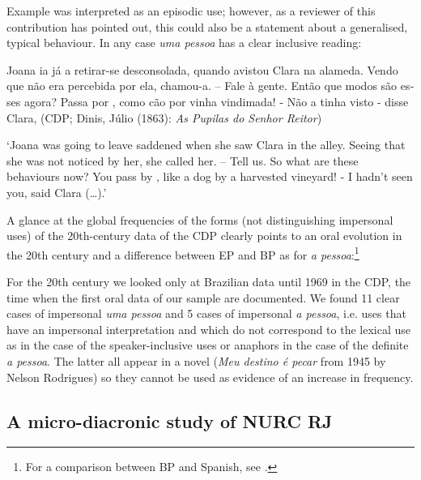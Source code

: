 \documentclass[output=paper]{langscibook}
\begin{document}
Example  was interpreted as an episodic use; however, as a reviewer of this contribution has pointed out, this could also be a statement about a generalised, typical behaviour. In any case \textit{uma pessoa} has a clear inclusive reading:



\eanoraggedright\label{ex:amaral:30}
\begin{otherlanguage}{portuguese}
Joana ia já a retirar-se desconsolada, quando avistou Clara na alameda. Vendo que não era percebida por ela, chamou-a. – Fale à gente. Então que modos são esses agora? Passa por , como cão por vinha vindimada! - Não a tinha visto - disse Clara, {(CDP; Dinis, Júlio (1863):} \textit{As Pupilas do Senhor Reitor})
\end{otherlanguage}
\glt ‘Joana was going to leave saddened when she saw Clara in the alley. Seeing that she was not noticed by her, she called her. – Tell us. So what are these behaviours now? You pass by , like a dog by a harvested vineyard! - I hadn’t seen you, said Clara (…).' 
\z 


A glance at the global frequencies of the forms (not distinguishing impersonal uses) of the 20th-century data of the CDP clearly points to an oral evolution in the 20th century and a difference between EP and BP as for \textit{a pessoa}:\footnote{For a comparison between BP and Spanish, see \citet{Amaral2017}.}


For the 20th century we looked only at Brazilian data until 1969 in the CDP, the time when the first oral data of our sample are documented. We found 11 clear cases of impersonal \textit{uma pessoa} and 5 cases of impersonal \textit{a pessoa}, i.e. uses that have an impersonal interpretation and which do not correspond to the lexical use as in the case of the speaker-inclusive uses or anaphors in the case of the definite \textit{a pessoa}. The latter all appear in a novel (\textit{Meu destino é pecar} from 1945 by Nelson Rodrigues) so they cannot be used as evidence of an increase in frequency.



\subsection{A micro-diacronic study of NURC RJ}\label{sec:amaral:5.2}
\end{document}
